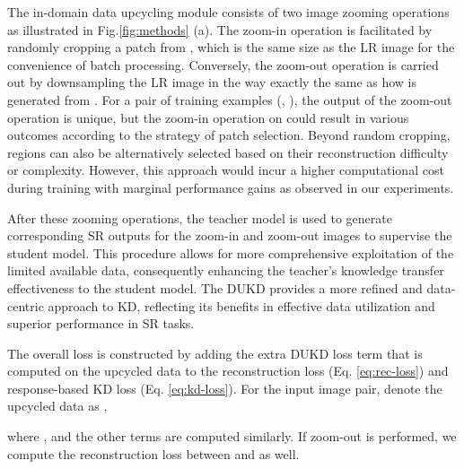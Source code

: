 \documentclass[10pt,twocolumn,letterpaper]{article}
\begin{document}
The in-domain data upcycling module consists of two image zooming operations as illustrated in Fig.\ref{fig:methods} (a). The zoom-in operation is facilitated by randomly cropping a patch from , which is the same size as the LR image  for the convenience of batch processing. Conversely, the zoom-out operation is carried out by downsampling the LR image in the way exactly the same as how  is generated from . For a pair of training examples (, ), the output of the zoom-out operation is unique, but the zoom-in operation on  could result in various outcomes according to the strategy of patch selection. Beyond random cropping, regions can also be alternatively selected based on their reconstruction difficulty or complexity. However, this approach would incur a higher computational cost during training with marginal performance gains as observed in our experiments.

After these zooming operations, the teacher model is used to generate corresponding SR outputs for the zoom-in and zoom-out images to supervise the student model.
This procedure allows for more comprehensive exploitation of the limited available data, consequently enhancing the teacher's knowledge transfer effectiveness to the student model. The DUKD provides a more refined and data-centric approach to KD, reflecting its benefits in effective data utilization and superior performance in SR tasks.

The overall loss is constructed by adding the extra DUKD loss term that is computed on the upcycled data to the reconstruction loss (Eq. \ref{eq:rec-loss}) and response-based KD loss (Eq. \ref{eq:kd-loss}). For the input  image pair, denote the upcycled data as ,

where ,  and the other terms are computed similarly. If zoom-out is performed, we compute the reconstruction loss between  and  as well.
\end{document}
